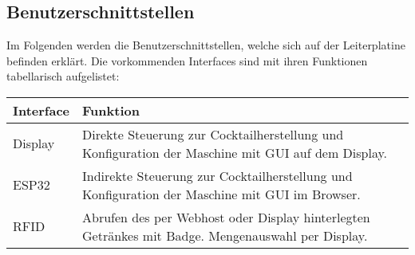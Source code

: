 \clearpage
\subsection{Benutzerschnittstellen}
\label{subsec:Benutzerschnittstellen}

Im Folgenden werden die Benutzerschnittstellen, welche sich auf der Leiterplatine befinden erklärt. Die vorkommenden Interfaces sind mit ihren Funktionen tabellarisch aufgelistet:

\begin{tabularx}{\textwidth}{|l|X|}
\hline
\textbf{Interface} & \textbf{Funktion}\\
\hline
Display & Direkte Steuerung zur Cocktailherstellung und Konfiguration der Maschine mit GUI auf dem Display. \\
\hline
ESP32 & Indirekte Steuerung zur Cocktailherstellung und Konfiguration der Maschine mit GUI im Browser.\\
\hline
RFID & Abrufen des per Webhost oder Display hinterlegten Getränkes mit Badge. Mengenauswahl per Display.\\
\hline
\end{tabularx}

